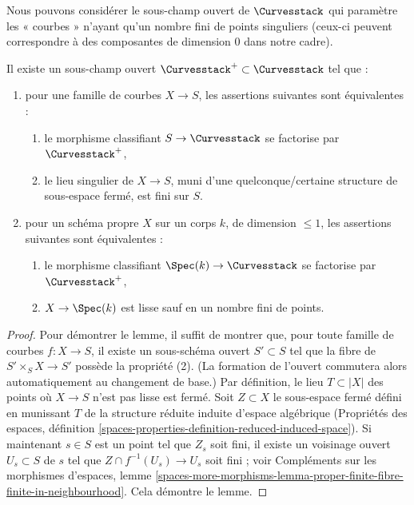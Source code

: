 \noindent
Nous pouvons considérer le sous-champ ouvert de $\Curvesstack$
qui paramètre les « courbes » n'ayant qu'un nombre fini de points
singuliers (ceux-ci peuvent correspondre à des composantes de dimension $0$
dans notre cadre).

\begin{lemma}
\label{lemma-isolated-sings-curves}
Il existe un sous-champ ouvert
$\Curvesstack^{+} \subset \Curvesstack$
tel que :
\begin{enumerate}
\item pour une famille de courbes $X \to S$, les assertions suivantes sont équivalentes :
\begin{enumerate}
\item le morphisme classifiant $S \to \Curvesstack$ se factorise par
$\Curvesstack^{+}$,
\item le lieu singulier de $X \to S$, muni
d'une quelconque/certaine structure de sous-espace fermé, est fini sur $S$.
\end{enumerate}
\item pour un schéma propre $X$ sur un corps $k$, de dimension $\leq 1$,
les assertions suivantes sont équivalentes :
\begin{enumerate}
\item le morphisme classifiant $\Spec(k) \to \Curvesstack$ se factorise
par $\Curvesstack^{+}$,
\item $X \to \Spec(k)$ est lisse sauf en un nombre fini de points.
\end{enumerate}
\end{enumerate}
\end{lemma}

\begin{proof}
Pour démontrer le lemme, il suffit de montrer que, pour toute famille de courbes
$f : X \to S$, il existe un sous-schéma ouvert $S' \subset S$
tel que la fibre de $S' \times_S X \to S'$ possède la propriété (2).
(La formation de l'ouvert commutera alors automatiquement au changement de base.)
Par définition, le lieu $T \subset |X|$ des points où $X \to S$
n'est pas lisse est fermé. Soit $Z \subset X$ le sous-espace fermé
défini en munissant $T$ de la structure réduite induite d'espace algébrique
(Propriétés des espaces, définition
\ref{spaces-properties-definition-reduced-induced-space}).
Si maintenant $s \in S$ est un point tel que $Z_s$ soit fini, il existe
un voisinage ouvert $U_s \subset S$ de $s$ tel que
$Z \cap f^{-1}(U_s) \to U_s$ soit fini ; voir
Compléments sur les morphismes d'espaces, lemme
\ref{spaces-more-morphisms-lemma-proper-finite-fibre-finite-in-neighbourhood}.
Cela démontre le lemme.
\end{proof}




